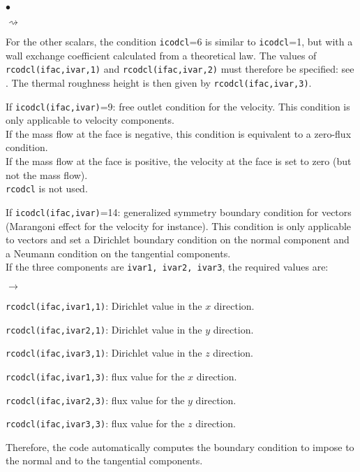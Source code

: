 {{{\begin{list}{$\bullet$}{}
\begin{list}{$\rightsquigarrow$}{}
\item For the other scalars, the condition \texttt{icodcl}=6 is similar to
      \texttt{icodcl}=1, but with a wall exchange coefficient calculated from a
      theoretical law. The values of \texttt{rcodcl(ifac,ivar,1)} and
      \texttt{rcodcl(ifac,ivar,2)} must therefore be specified: see \cite{theory}.
      The thermal roughness height is then given by \texttt{rcodcl(ifac,ivar,3)}.
\end{list}

\item If \texttt{icodcl(ifac,ivar)}=9: free outlet condition for the
      velocity. This condition is only applicable to velocity
      components.\\
      If the mass flow at the face is negative, this condition is equivalent
      to a zero-flux condition.\\
      If the mass flow at the face is positive, the velocity at the face is set to zero (but not the mass flow).\\
\texttt{rcodcl} is not used.

\item If \texttt{icodcl(ifac,ivar)}=14: generalized symmetry boundary condition for vectors (Marangoni
      effect for the velocity for instance).
      This condition is only applicable to vectors and set a Dirichlet boundary condition on the normal
      component and a Neumann condition on the tangential components.\\
      If the three components are  \texttt{ivar1, ivar2, ivar3}, the required values are:

\begin{list}{$\rightarrow$}{}
      \item \texttt{rcodcl(ifac,ivar1,1)}: Dirichlet value in the $x$ direction.
      \item \texttt{rcodcl(ifac,ivar2,1)}: Dirichlet value in the $y$ direction.
      \item \texttt{rcodcl(ifac,ivar3,1)}: Dirichlet value in the $z$ direction.
      \item \texttt{rcodcl(ifac,ivar1,3)}: flux value for the $x$ direction.
      \item \texttt{rcodcl(ifac,ivar2,3)}: flux value for the $y$ direction.
      \item \texttt{rcodcl(ifac,ivar3,3)}: flux value for the $z$ direction.
\end{list}
      Therefore, the code automatically computes the boundary condition to impose to the normal and to
      the tangential components.


\end{list}}}}
